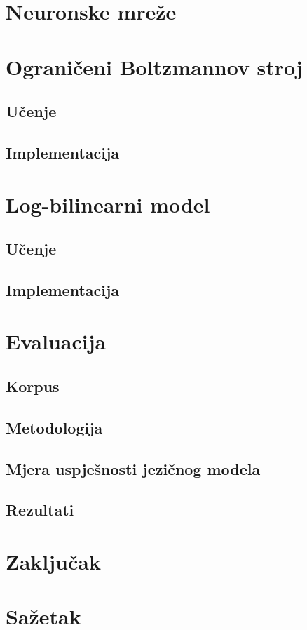 \documentclass[times, utf8, diplomski, numeric]{fer}
\begin{document}
\chapter{Neuronske mreže}

\chapter{Ograničeni Boltzmannov stroj}

\section{Učenje}

\section{Implementacija}

\chapter{Log-bilinearni model}

\section{Učenje}

\section{Implementacija}

\chapter{Evaluacija}

\section{Korpus}

\section{Metodologija}

\section{Mjera uspješnosti jezičnog modela}

\section{Rezultati}

\chapter{Zaključak} 




\chapter{Sažetak}
\end{document}
